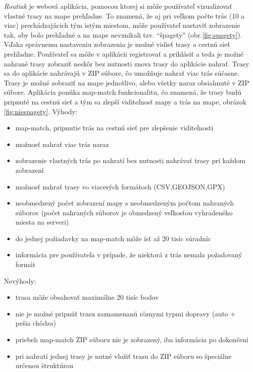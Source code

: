 \indent \textit{Routiak} je webová aplikácia, pomocou ktorej si môže používateľ vizualizovať vlastné trasy na mape prehľadne. To znamená, že aj pri veľkom počte trás (10 a viac) prechádzajúcich tým istým miestom, môže používateľ nastaviť zobrazenie tak, aby bolo prehľadné a na mape nevznikali tzv. ``špagety'' (obr.\ref{fig:spagety}). Vďaka správnemu nastaveniu zobrazenia je možné vidieť trasy a cestnú sieť prehľadne. Používateľ sa môže v aplikácii registrovať a prihlásiť a teda je možné nahrané trasy zobraziť neskôr bez nutnosti znova trasy do aplikácie nahrať. Trasy sa do aplikácie nahrávajú v ZIP súbore, čo umožňuje nahrať viac trás súčasne. Trasy je možné zobraziť na mape jednotlivo, alebo všetky naraz obsiahnuté v ZIP súbore. Aplikácia ponúka map-match funkcionalitu, čo znamená, že trasy budú pripnuté na cestnú sieť a tým sa zlepší viditeľnosť mapy a trás na mape, obrázok \ref{fig:niespagety}. 
\newline Výhody:
\begin{itemize}
  \item map-match, pripnutie trás na cestnú sieť pre zlepšenie viditeľnosti
  \item možnosť nahrať viac trás naraz
  \item zobrazenie vlastných trás po nahratí bez nutnosti nahrávať trasy pri každom zobrazení
  \item možnosť nahrať trasy vo viacerých formátoch (CSV,GEOJSON,GPX)
  \item neobmedzený počet zobrazení mapy s neobmedzeným počtom nahraných súborov (počet nahraných súborov je obmedzený veľkosťou vyhradeného miesta na serveri)
  \item do jednej požiadavky na map-match môže ísť až 20 tisíc súradníc
  \item informácia pre používateľa v prípade, že niektorá z trás nemala požadovaný formát 
\end{itemize}
Nevýhody:
\begin{itemize}
  \item trasa môže obsahovať maximálne 20 tisíc bodov
  \item nie je možné pripnúť trasu zaznamenanú rôznymi typmi dopravy (auto + pešia chôdza)
  \item priebeh map-match ZIP súboru nie je zobrazený, iba informácia po dokončení
  \item pri nahratí jednej trasy je nutné vložiť trasu do ZIP súboru so špeciálne určenou štruktúrou
\end{itemize}

